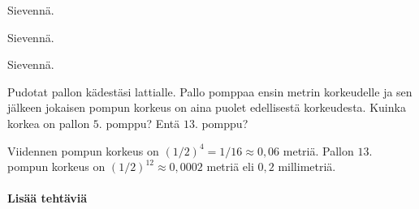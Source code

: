 \begin{tehtavasivu}
 \begin{tehtava}
        Sievennä.
        \begin{vastaus}
        \end{vastaus}
    \end{tehtava}
\begin{tehtava}
Sievennä.

\begin{vastaus}
\end{vastaus}
\end{tehtava}

\begin{tehtava}
Sievennä.

\begin{vastaus}
\end{vastaus}
\end{tehtava}

\begin{tehtava}
        Pudotat pallon kädestäsi lattialle. Pallo pomppaa ensin metrin korkeudelle ja sen jälkeen jokaisen pompun korkeus on aina puolet edellisestä korkeudesta. Kuinka korkea on pallon $5$. pomppu? Entä $13$. pomppu?     
        \begin{vastaus}
        Viidennen pompun korkeus on $(1/2)^4=1/16 \approx 0,06$ metriä. Pallon $13$. pompun korkeus on $(1/2)^{12} \approx 0,0002$ metriä eli $0,2$ millimetriä.
        \end{vastaus}
\end{tehtava}


\paragraph*{Lisää tehtäviä}


\end{tehtavasivu}
